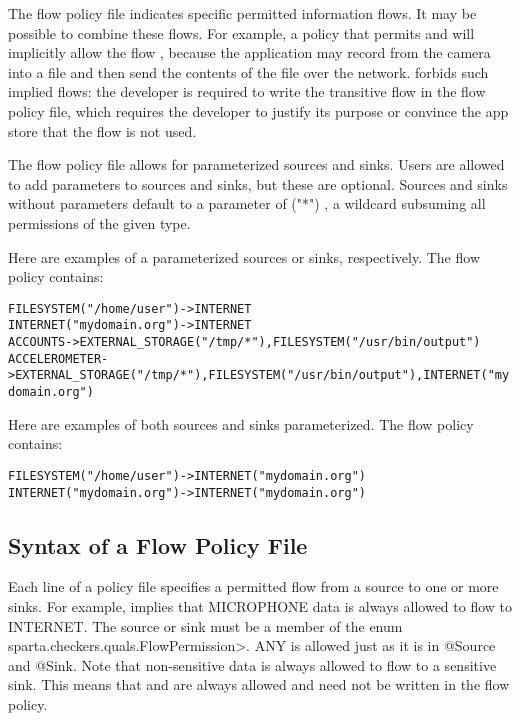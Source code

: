 \label{sec:flow-policy-transitivity}
The flow policy file indicates specific permitted information flows.  It
may be possible to combine these flows.
For example, a policy that permits
 and 
will implicitly allow the flow ,
because the application may record from the camera into a file
and then send the contents of the file over the network.
\TheFlowChecker forbids such implied flows:  the developer is required to write
the transitive flow in the flow policy file, which requires the developer
to justify its purpose or convince the app store that the flow is not used.

\label{sec:flow-policy-parameterized}
The flow policy file allows for parameterized sources and sinks. Users
are allowed to add parameters to sources and sinks, but these are optional.
Sources and sinks without parameters default to a parameter of ("*") , a 
wildcard subsuming all permissions of the given type.\newline

\noindent
Here are examples of a parameterized sources or sinks, respectively.
The flow policy contains:
\begin{alltt}
  FILESYSTEM("/home/user") -> INTERNET
  INTERNET("mydomain.org") -> INTERNET
  ACCOUNTS      -> EXTERNAL_STORAGE("/tmp/*"), FILESYSTEM("/usr/bin/output")
  ACCELEROMETER -> EXTERNAL_STORAGE("/tmp/*"), FILESYSTEM("/usr/bin/output"), INTERNET("mydomain.org")
\end{alltt}

\noindent
Here are examples of both sources and sinks parameterized.
The flow policy contains:
\begin{alltt}
  FILESYSTEM("/home/user") -> INTERNET("mydomain.org")
  INTERNET("mydomain.org") -> INTERNET("mydomain.org")
\end{alltt}

\subsection{Syntax of a Flow Policy File}

Each line of a policy file specifies a permitted flow from a source to one
or more sinks.  For example,
 implies that
MICROPHONE data is always allowed to flow to INTERNET.
The source or sink must be a member of the enum
\<sparta.checkers.quals.FlowPermission>.  
ANY is allowed just as it is in @Source and @Sink.  Note that non-sensitive  
data is always allowed to flow to a sensitive sink.  This means that
 and  are always allowed and need not be 
written in the flow policy. 

